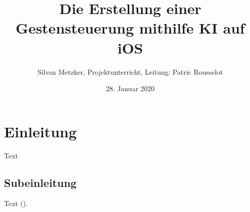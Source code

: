 \documentclass[12pt]{article}
\begin{document}
\title{Die Erstellung einer Gestensteuerung mithilfe KI auf iOS}
\date{28. Januar 2020}
\author{Silvan Metzker, Projektunterricht, Leitung: Patric Rousselot}
\maketitle


\section*{Einleitung}

Text

\subsection*{Subeinleitung}

Text ().
\end{document}
